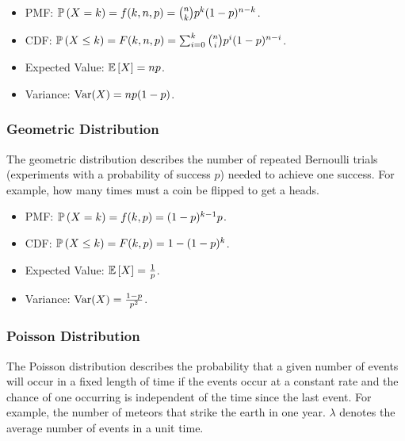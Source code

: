 \documentclass[12pt, titlepage]{article}
\begin{document}
\begin{info}{}
\begin{itemize}
	\item PMF: $\mathbb{P}\left(X = k\right) = f(k, n, p) = {n \choose k} p^k (1-p)^{n-k}$.
	\item CDF: $\mathbb{P}\left(X \leq k\right) = F(k, n, p) = \sum_{i = 0}^k {n \choose i}p^i(1-p)^{n-i}$.
	\item Expected Value: $\mathbb{E}\left[X\right] = np$.
	\item Variance: $\operatorname{Var}(X) = np(1-p)$.
\end{itemize}
\end{info}

\subsubsection{Geometric Distribution}

\begin{rmk}{}
The geometric distribution describes the number of repeated Bernoulli trials (experiments with a probability of success $p$) needed to achieve one success. For example, how many times must a coin be flipped to get a heads. 
\end{rmk}

\begin{info}{}
	\begin{itemize}
		\item PMF: $\mathbb{P}\left(X = k\right) = f(k, p) = (1-p)^{k-1}p$.
		\item CDF: $\mathbb{P}\left(X \leq k\right) = F(k, p) = 1 - (1 - p)^k$.
		\item Expected Value: $\mathbb{E}\left[X\right] = \frac{1}{p}$.
		\item Variance: $\operatorname{Var}(X) = \frac{1-p}{p^2}$.
	\end{itemize}
\end{info}

\subsubsection{Poisson Distribution}

\begin{rmk}{}
	The Poisson distribution describes the probability that a given number of events will occur in a fixed length of time if the events occur at a constant rate and the chance of one occurring is independent of the time since the last event. For example, the number of meteors that strike the earth in one year. $\lambda$ denotes the average number of events in a unit time.
\end{rmk}
\end{document}
